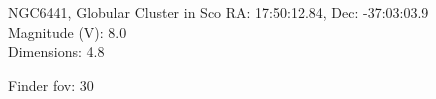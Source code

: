 \begin{block}{NGC6441, Globular Cluster in Sco}
    RA: 17:50:12.84, Dec: -37:03:03.9 \\ 
    Magnitude (V): 8.0 \\ 
    Dimensions: 4.8 

    Finder fov: 30 
\end{block}